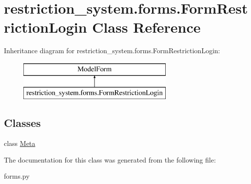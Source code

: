 \hypertarget{classrestriction__system_1_1forms_1_1FormRestrictionLogin}{}\section{restriction\+\_\+system.\+forms.\+Form\+Restriction\+Login Class Reference}
\label{classrestriction__system_1_1forms_1_1FormRestrictionLogin}
Inheritance diagram for restriction\+\_\+system.\+forms.\+Form\+Restriction\+Login\+:\begin{figure}[H]
\begin{center}
\leavevmode
\includegraphics[height=2.000000cm]{classrestriction__system_1_1forms_1_1FormRestrictionLogin}
\end{center}
\end{figure}
\subsection*{Classes}
\begin{DoxyCompactItemize}
\item 
class \hyperlink{classrestriction__system_1_1forms_1_1FormRestrictionLogin_1_1Meta}{Meta}
\end{DoxyCompactItemize}


The documentation for this class was generated from the following file\+:\begin{DoxyCompactItemize}
\item 
forms.\+py\end{DoxyCompactItemize}
